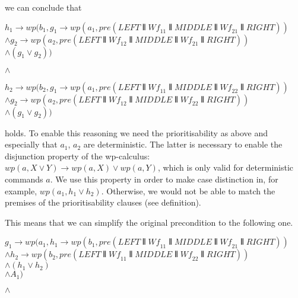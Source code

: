 \documentclass[11pt]{article}
\newcommand{\Wf}{\mathit{Wf}}
\begin{document}
\noindent
we can conclude that 

\noindent
$h_1 \longrightarrow wp(b_1,g_1 \longrightarrow wp(a_1,pre(LEFT \interleave \Wf_{11} \interleave MIDDLE \interleave \Wf_{21} \interleave RIGHT))$ \\
\hspace*{60pt}        $\land g_2 \longrightarrow wp(a_2,pre(LEFT \interleave \Wf_{12} \interleave MIDDLE \interleave \Wf_{21} \interleave RIGHT))$ \\
\hspace*{60pt}        $\land (g_1 \lor g_2))$ 

\noindent
$\land$

\noindent
$h_2 \longrightarrow wp(b_2,g_1 \longrightarrow wp(a_1,pre(LEFT \interleave \Wf_{11} \interleave MIDDLE \interleave \Wf_{22} \interleave RIGHT))$ \\
\hspace*{60pt} $\land g_2 \longrightarrow wp(a_2,pre(LEFT \interleave \Wf_{12} \interleave MIDDLE \interleave \Wf_{22} \interleave RIGHT))$ \\ 
\hspace*{60pt} $\land (g_1 \lor g_2))$

\noindent
holds. To enable this reasoning we need the prioritisability as above and especially that $a_1$, $a_2$ are deterministic. The latter is necessary to enable the disjunction property of the wp-calculus: $wp(a,X \lor Y) \longrightarrow wp(a,X) \lor wp(a,Y)$, which is only valid for deterministic commands $a$. We use this property in order to make case distinction in, for example, $wp(a_1,h_1 \lor h_2)$. Otherwise, we would not be able to match the premises of the prioritisability clauses (see definition).

\noindent
This means that we can simplify the original precondition to the following one.

\noindent
$g_1 \longrightarrow wp(a_1,h_1 \longrightarrow wp(b_1,pre(LEFT \interleave \Wf_{11} \interleave MIDDLE \interleave \Wf_{21} \interleave RIGHT))$ \\
\hspace*{60pt}          $\land h_2 \longrightarrow wp(b_2,pre(LEFT \interleave \Wf_{11} \interleave MIDDLE \interleave \Wf_{22} \interleave RIGHT))$ \\
\hspace*{60pt}          $\land (h_1 \lor h_2)$ \\
\hspace*{60pt} $\land A_1)$ 

\noindent
$\land$
\end{document}

